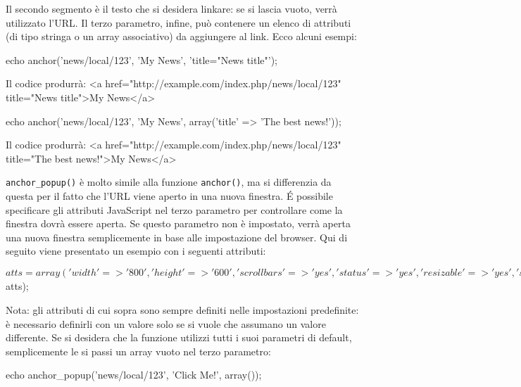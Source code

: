 Il secondo segmento è il testo che si desidera linkare: se si lascia vuoto, verrà utilizzato l'URL. Il terzo parametro, infine, può contenere un elenco di attributi (di tipo stringa o un array associativo) da aggiungere al link. Ecco alcuni esempi:

\begin{code}
echo anchor('news/local/123', 'My News', 'title="News title"');
\end{code}

Il codice produrrà: <a href="http://example.com/index.php/news/local/123" title="News title">My News</a>

\begin{code}
echo anchor('news/local/123', 'My News', array('title' => 'The best news!'));
\end{code}

Il codice produrrà: <a href="http://example.com/index.php/news/local/123" title="The best news!">My News</a>

\verb|anchor_popup()| è molto simile alla funzione \verb|anchor()|, ma si differenzia da questa per il fatto che l'URL viene aperto in una nuova finestra. \'E possibile specificare gli attributi JavaScript nel terzo parametro per controllare come la finestra dovrà essere aperta. Se questo parametro non è impostato, verrà aperta una nuova finestra semplicemente in base alle impostazione del browser. Qui di seguito viene presentato un esempio con i seguenti attributi:

\begin{code}
$atts = array(
              'width'      => '800',
              'height'     => '600',
              'scrollbars' => 'yes',
              'status'     => 'yes',
              'resizable'  => 'yes',
              'screenx'    => '0',
              'screeny'    => '0'
            );

echo anchor_popup('news/local/123', 'Click Me!', $atts);
\end{code}

Nota: gli attributi di cui sopra sono sempre definiti nelle impostazioni predefinite: è necessario definirli con un valore solo se si vuole che assumano un valore differente. Se si desidera che la funzione utilizzi tutti i suoi parametri di default, semplicemente le si passi un array vuoto nel terzo parametro:

\begin{code}
echo anchor_popup('news/local/123', 'Click Me!', array());
\end{code}

